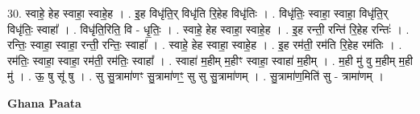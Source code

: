 \documentclass[17pt]{extarticle}
\begin{document}
30. स्वाहे॒ हेह स्वाहा॒ स्वाहे॒ह । . इ॒ह विधृ॑ति॒र् विधृ॑ति रि॒हेह विधृ॑तिः । . विधृ॑तिः॒ स्वाहा॒ स्वाहा॒ विधृ॑ति॒र् विधृ॑तिः॒ स्वाहा᳚ । . विधृ॑ति॒रिति॒ वि - धृ॒तिः॒ । . स्वाहे॒ हेह स्वाहा॒ स्वाहे॒ह । . इ॒ह रन्ती॒ रन्ति॑ रि॒हेह रन्तिः॑ । . रन्तिः॒ स्वाहा॒ स्वाहा॒ रन्ती॒ रन्तिः॒ स्वाहा᳚ । . स्वाहे॒ हेह स्वाहा॒ स्वाहे॒ह । . इ॒ह रम॑ती॒ रम॑ति रि॒हेह रम॑तिः । . रम॑तिः॒ स्वाहा॒ स्वाहा॒ रम॑ती॒ रम॑तिः॒ स्वाहा᳚ । . स्वाहा॑ म॒हीम् म॒हीꣳ स्वाहा॒ स्वाहा॑ म॒हीम् । . म॒ही मु॑ वु म॒हीम् म॒ही मु॑ । . ऊ॒ षु सू॑ षु । . सु सु॒त्रामा॑णꣳ सु॒त्रामा॑णꣳ॒॒ सु सु सु॒त्रामा॑णम् । . सु॒त्रामा॑ण॒मिति॑ सु - त्रामा॑णम् । \newline

\textbf{Ghana Paata } \newline
\end{document}

